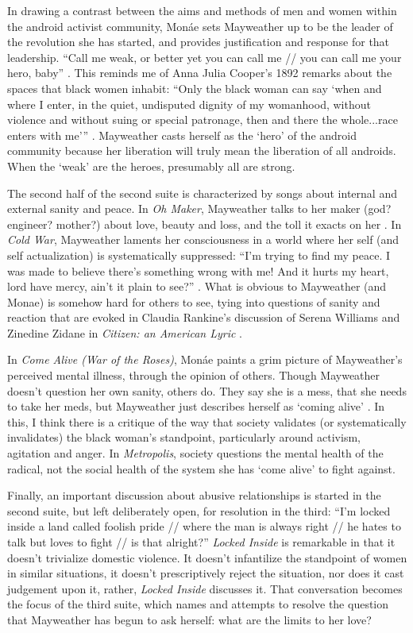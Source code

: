 \documentclass[a4paper, 11pt]{article} %
\begin{document}
In drawing a contrast between the aims and methods of men and women within the android activist community, Mon\'ae sets Mayweather up to be the leader of the revolution she has started, and provides justification and response for that leadership.
``Call me weak, or better yet you can call me // you can call me your hero, baby'' \cite{faster}.
This reminds me of Anna Julia Cooper's 1892 remarks about the spaces that black women inhabit:
``Only the black woman can say `when and where I enter, in the quiet, undisputed dignity of my womanhood, without violence and without suing or special patronage, then and there the whole...race enters with me''' \cite{cooper1892}.
Mayweather casts herself as the `hero' of the android community because her liberation will truly mean the liberation of all androids.
When the `weak' are the heroes, presumably all are strong.

The second half of the second suite is characterized by songs about internal and external sanity and peace.
In \emph{Oh Maker}, Mayweather talks to her maker (god? engineer? mother?) about love, beauty and loss, and the toll it exacts on her \cite{ohmaker}.
In \emph{Cold War}, Mayweather laments her consciousness in a world where her self (and self actualization) is systematically suppressed:
``I'm trying to find my peace.  I was made to believe there's something wrong with me! And it hurts my heart, lord have mercy, ain't it plain to see?'' \cite{coldwar}.
What is obvious to Mayweather (and Monae) is somehow hard for others to see, tying into questions of sanity and reaction that are evoked in Claudia Rankine's discussion of Serena Williams and Zinedine Zidane in \emph{Citizen: an American Lyric} \cite{citizen}.

In \emph{Come Alive (War of the Roses)}, Mon\'ae paints a grim picture of Mayweather's perceived mental illness, through the opinion of others.
Though Mayweather doesn't question her own sanity, others do.  
They say she is a mess, that she needs to take her meds, but Mayweather just describes herself as `coming alive' \cite{roses}.
In this, I think there is a critique of the way that society validates (or systematically invalidates) the black woman's standpoint, particularly around activism, agitation and anger.
In \emph{Metropolis}, society questions the mental health of the radical, not the social health of the system she has `come alive' to fight against.

Finally, an important discussion about abusive relationships is started in the second suite, but left deliberately open, for resolution in the third:
``I'm locked inside a land called foolish pride // where the man is always right // he hates to talk but loves to fight // is that alright?'' \cite{lockedinside}
\emph{Locked Inside} is remarkable in that it doesn't trivialize domestic violence. 
It doesn't infantilize the standpoint of women in similar situations, it doesn't prescriptively reject the situation, nor does it cast judgement upon it, rather, \emph{Locked Inside} discusses it.
That conversation becomes the focus of the third suite, which names and attempts to resolve the question that Mayweather has begun to ask herself:
what are the limits to her love?
\end{document}
